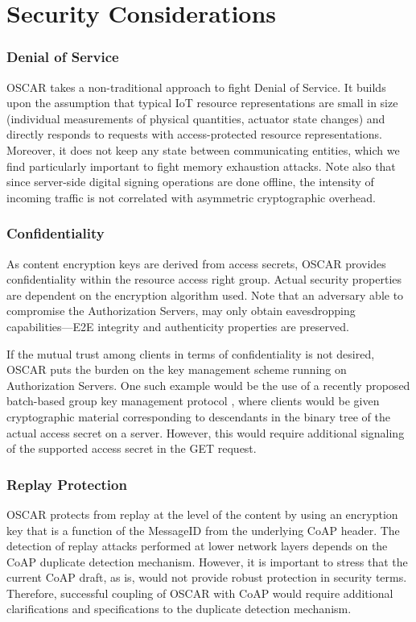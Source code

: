 \documentclass[conference]{IEEEtran}
\begin{document}
 

 
 \section{Security Considerations}
 \label{security}
 \subsubsection*{Denial of Service}






OSCAR takes a non-traditional approach to fight Denial of Service. It builds upon the
assumption that typical IoT resource representations are small in size
(individual measurements of physical quantities, actuator state changes) and
directly responds to requests with access-protected resource
representations. Moreover, it does not keep any state between communicating
entities, which we find particularly important to fight memory exhaustion
attacks. Note also that since server-side digital signing operations are done
offline, the intensity of incoming traffic is not correlated with asymmetric cryptographic overhead. 


 
 \subsubsection*{Confidentiality}
As content encryption keys are derived from access secrets, OSCAR provides confidentiality within the resource access right group. Actual security properties are dependent on the encryption algorithm used. Note that an adversary able to compromise the Authorization Servers, may only obtain eavesdropping capabilities---E2E integrity and authenticity properties are preserved.

If the mutual trust among clients in terms of confidentiality is not desired,
OSCAR puts the burden on the key management scheme running on Authorization
Servers. One such example would be the use of a recently proposed batch-based
group key management protocol \cite{veltri-batch}, where clients would be given
cryptographic material corresponding to descendants in the binary tree of the
actual access secret on a server. However, this would require additional signaling of the supported access secret in the GET request.

 \subsubsection*{Replay Protection}
OSCAR protects from replay at the level of the content by using an encryption
key that is a function of the MessageID from the underlying CoAP header. The detection of replay attacks performed at lower network layers depends on the CoAP duplicate detection mechanism. 
However, it is important to stress that the current CoAP draft, as is, would not provide robust protection in security terms. Therefore, successful coupling of OSCAR with CoAP would require additional clarifications and specifications to the duplicate detection mechanism.
\end{document}
